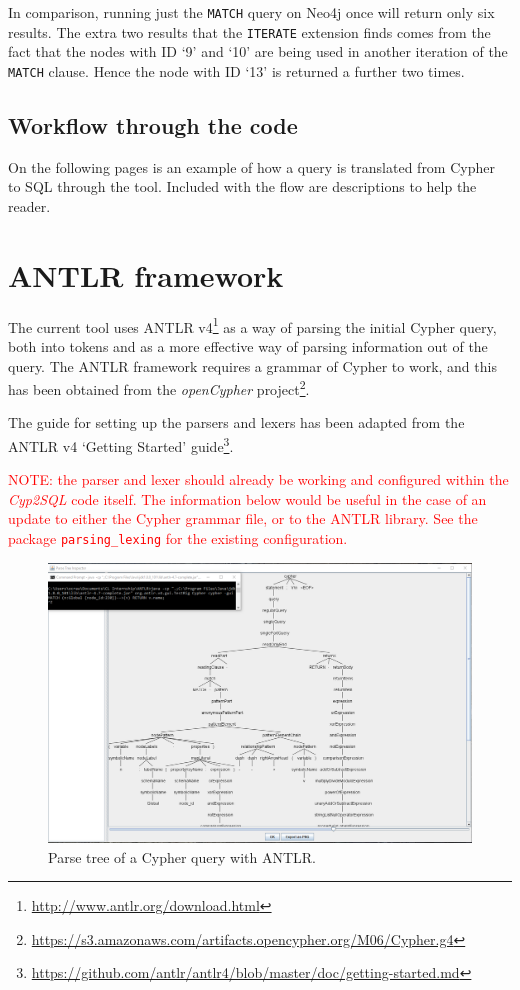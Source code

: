 \documentclass[letterpaper]{ltxdoc}
\begin{document}
In comparison, running just the \texttt{MATCH} query on Neo4j once will return only six results. The extra two results that the \texttt{ITERATE} extension finds comes from the fact that the nodes with ID `9' and `10' are being used in another iteration of the \texttt{MATCH} clause. Hence the node with ID `13' is returned a further two times.

\subsection{Workflow through the code}
\label{ssec:workflow}
On the following pages is an example of how a query is translated from Cypher to SQL through the tool. Included with the flow are descriptions to help the reader.

\newpage



\section{ANTLR framework}
\label{sec:antlr}
The current tool uses ANTLR v4\footnote{\url{http://www.antlr.org/download.html}} as a way of parsing the initial Cypher query, both into tokens and as a more effective way of parsing information out of the query. The ANTLR framework requires a grammar of Cypher to work, and this has been obtained from the \emph{openCypher} project\footnote{\url{https://s3.amazonaws.com/artifacts.opencypher.org/M06/Cypher.g4}}.

The guide for setting up the parsers and lexers has been adapted from the ANTLR v4 `Getting Started' guide\footnote{\url{https://github.com/antlr/antlr4/blob/master/doc/getting-started.md}}.

\medskip

\textcolor{red}{NOTE: the parser and lexer should already be working and configured within the \emph{Cyp2SQL} code itself. The information below would be useful in the case of an update to either the Cypher grammar file, or to the ANTLR library. See the package \texttt{parsing\_lexing} for the existing configuration.}

\begin{figure}[h]
\centerline{\includegraphics[width=\textwidth,height=\textheight,keepaspectratio]{ss3.png}}
\caption{Parse tree of a Cypher query with ANTLR.}
\label{antlrs}
\end{figure}
\end{document}
